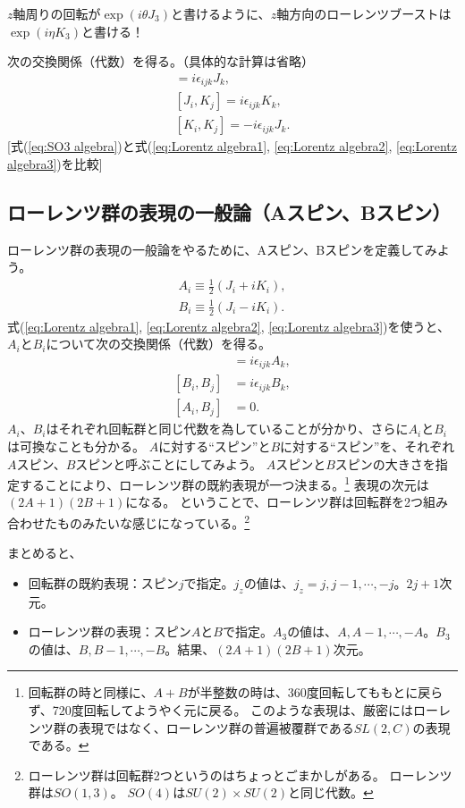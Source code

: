 \documentclass[10pt,a4paper]{jarticle}
\begin{document}
$z$軸周りの回転が$\exp(i \theta J_3 )$と書けるように、$z$軸方向のローレンツブーストは$\exp(i\eta K_3)$と書ける！

次の交換関係（代数）を得る。（具体的な計算は省略）
\begin{align}
[J_i, J_j] = i\epsilon_{ijk} J_k, \label{eq:Lorentz algebra1}\\
[J_i, K_j] = i\epsilon_{ijk} K_k, \label{eq:Lorentz algebra2}\\
[K_i, K_j] = -i\epsilon_{ijk} J_k. \label{eq:Lorentz algebra3}
\end{align}
[式(\ref{eq:SO3 algebra})と式(\ref{eq:Lorentz algebra1}, \ref{eq:Lorentz algebra2}, \ref{eq:Lorentz algebra3})を比較]


\subsection{ローレンツ群の表現の一般論（Aスピン、Bスピン）}
ローレンツ群の表現の一般論をやるために、Aスピン、Bスピンを定義してみよう。
\begin{align}
A_i \equiv \frac{1}{2}(J_i + i K_i), \\
B_i \equiv \frac{1}{2}(J_i - i K_i).
\end{align}
%
式(\ref{eq:Lorentz algebra1}, \ref{eq:Lorentz algebra2}, \ref{eq:Lorentz algebra3})を使うと、
$A_i$と$B_i$について次の交換関係（代数）を得る。
\begin{align}
[A_i, A_j] &= i\epsilon_{ijk} A_k, \\
[B_i, B_j] &= i\epsilon_{ijk} B_k, \\
[A_i, B_j] &= 0.
\end{align}
$A_i$、$B_i$はそれぞれ回転群と同じ代数を為していることが分かり、さらに$A_i$と$B_i$は可換なことも分かる。
$A$に対する``スピン''と$B$に対する``スピン''を、それぞれ$A$スピン、$B$スピンと呼ぶことにしてみよう。
$A$スピンと$B$スピンの大きさを指定することにより、ローレンツ群の既約表現が一つ決まる。\footnote{
回転群の時と同様に、$A+B$が半整数の時は、360度回転してももとに戻らず、720度回転してようやく元に戻る。
このような表現は、厳密にはローレンツ群の表現ではなく、ローレンツ群の普遍被覆群である$SL(2,C)$の表現である。
}
表現の次元は$(2A+1)(2B+1)$になる。
ということで、ローレンツ群は回転群を2つ組み合わせたものみたいな感じになっている。\footnote{
ローレンツ群は回転群2つというのはちょっとごまかしがある。
ローレンツ群は$SO(1,3)$。
$SO(4)$は$SU(2) \times SU(2)$と同じ代数。
}

まとめると、
\begin{itemize}
\item 回転群の既約表現：スピン$j$で指定。$j_z$の値は、$j_z = j, j-1, \cdots, -j$。$2j+1$次元。
\item ローレンツ群の表現：スピン$A$と$B$で指定。$A_3$の値は、$A, A-1, \cdots, -A$。$B_3$の値は、$B, B-1, \cdots, -B$。結果、$(2A+1)(2B+1)$次元。
\end{itemize}
\end{document}
